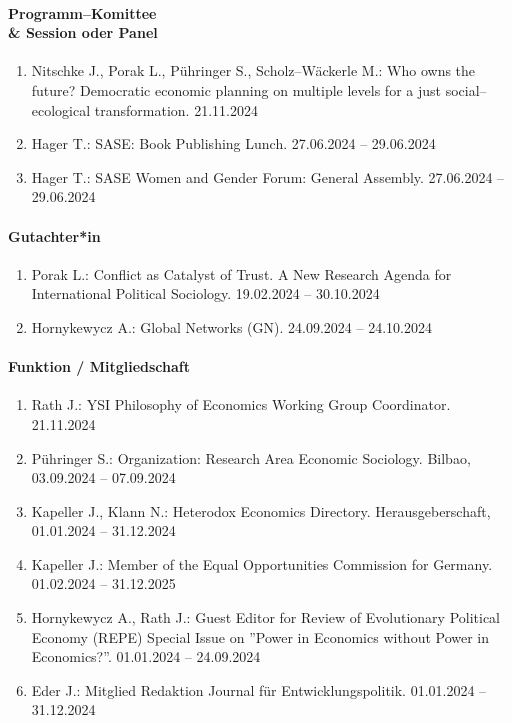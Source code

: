 \paragraph{Programm--Komittee \\\& Session oder Panel}
\begin{enumerate}[leftmargin=*, labelsep=0.5cm]
\item Nitschke J., Porak L., Pühringer S., Scholz--Wäckerle M.: Who owns the future? Democratic economic planning on multiple levels for a just social--ecological transformation. 21.11.2024
\item Hager T.: SASE: Book Publishing Lunch. 27.06.2024 -- 29.06.2024
\item Hager T.: SASE Women and Gender Forum: General Assembly. 27.06.2024 -- 29.06.2024
\end{enumerate}

\paragraph{Gutachter*in}
\begin{enumerate}[leftmargin=*, labelsep=0.5cm]
\item Porak L.: Conflict as Catalyst of Trust. A New Research Agenda for International Political Sociology. 19.02.2024 -- 30.10.2024
\item Hornykewycz A.: Global Networks (GN). 24.09.2024 -- 24.10.2024
\end{enumerate}

\paragraph{Funktion / Mitgliedschaft}
\begin{enumerate}[leftmargin=*, labelsep=0.5cm]
\item Rath J.: YSI Philosophy of Economics Working Group Coordinator. 21.11.2024
\item Pühringer S.: Organization: Research Area Economic Sociology. Bilbao, 03.09.2024 -- 07.09.2024
\item Kapeller J., Klann N.: Heterodox Economics Directory. Herausgeberschaft, 01.01.2024 -- 31.12.2024
\item Kapeller J.: Member of the Equal Opportunities Commission for Germany. 01.02.2024 -- 31.12.2025
\item Hornykewycz A., Rath J.: Guest Editor for Review of Evolutionary Political Economy (REPE) Special Issue on ''Power in Economics without Power in Economics?''. 01.01.2024 -- 24.09.2024
\item Eder J.: Mitglied Redaktion Journal für Entwicklungspolitik. 01.01.2024 -- 31.12.2024
\end{enumerate}
